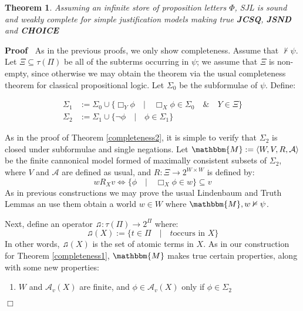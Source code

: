 \documentclass{article}
\newcommand{\assign}{:=}
\newcommand{\tmtextbf}[1]{{\bfseries{#1}}}
\newenvironment{enumeratenumeric}{\begin{enumerate}[1.] }{\end{enumerate}}
\newenvironment{proof}{\noindent\textbf{Proof\ }}{\hspace*{\fill}$\Box$\medskip}
\newtheorem{theorem}{Theorem}
\begin{document}
\begin{theorem}
  \label{completeness5}Assuming an infinite store of proposition letters
  $\Phi$, SJL is sound and weakly complete for simple justification models
  making true \tmtextbf{JCSQ}, \tmtextbf{JSND} and \tmtextbf{CHOICE}
\end{theorem}

\begin{proof}
  As in the previous proofs, we only show completeness.  Assume that $\nvdash
  \psi$.  Let $\Xi \subseteq \tau (\Pi)$ be all of the subterms occurring in
  $\psi$; we assume that $\Xi$ is non-empty, since otherwise we may obtain the
  theorem via the usual completeness theorem for classical propositional
  logic. Let $\Sigma_0$ be the subformulae of $\psi$.  Define:
  
  \begin{align*}
    {\Sigma}_1 &
    {\assign}{\Sigma}_0{\cup}\{\Box_Y{\phi}{\hspace{1em}}|{\hspace{1em}}\Box_X{\phi}{\in}{\Sigma}_0{\hspace{1em}}\&{\hspace{1em}}Y{\in}{\Xi}\}\\
    {\Sigma}_2 &
    {\assign}{\Sigma}_1{\cup}\{{\neg}{\phi}{\hspace{1em}}|{\hspace{1em}}{\phi}{\in}{\Sigma}_1\}
  \end{align*}
  
  As in the proof of Theorem \ref{completeness2}, it is simple to verify that
  $\Sigma_2$ is closed under subformulae and single negations.  Let
  $\mathbbm{M} \assign \langle W, V, R, \mathcal{A} \rangle$ be the finite
  cannonical model formed of maximally consistent subsets of $\Sigma_2$, where
  $V$ and $\mathcal{A}$ are defined as usual, and $R : \Xi \rightarrow 2^{W
  \times W}$ is defined by:
  \[ w R_X v \Longleftrightarrow \{\phi \hspace{1em} | \hspace{1em} \Box_X
     \phi \in w\} \subseteq v \]
  As in previous constructions we may prove the usual Lindenbaum and Truth
  Lemmas an use them obtain a world $w \in W$ where $\mathbbm{M}, w \nvDash
  \psi$.
  
  
  
  Next, define an operator $\twonotes : \tau (\Pi) \rightarrow 2^{\Pi}$ where:
  \[ \twonotes (X) \assign \{t \in \Pi \hspace{1em} | \hspace{1em} t \text{
     occurs in } X\} \]
  In other words, $\twonotes (X)$ is the set of atomic terms in $X$.  As in
  our construction for Theorem \ref{completeness1}, $\mathbbm{M}$ makes true
  certain properties, along with some new properties:
  \begin{enumeratenumeric}
    \item \label{fin}$W$ and $\mathcal{A}_v (X)$ are finite, and $\phi \in
    \mathcal{A}_v (X)$ only if $\phi \in \Sigma_2$
    

\end{enumeratenumeric}
\end{proof}
\end{document}
